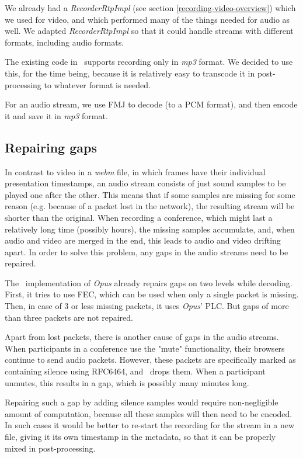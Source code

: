 \documentclass[twoside,openright,a4paper,12pt,english]{article}
\begin{document}
We already had a \emph{RecorderRtpImpl} (see section
\ref{recording-video-overview}) which we used for video, and which performed
many of the things needed for audio as well. We adapted \emph{RecorderRtpImpl}
so that it could handle streams with different formats, including audio
formats.

The existing code in \lj\ supports recording only in
\emph{mp3} format. We decided to use this, for the time being, because it is
relatively easy to transcode it in post-processing to whatever format is needed.

For an audio stream, we use FMJ to decode (to a PCM format), and
then encode it and save it in \emph{mp3} format.



\subsection{Repairing gaps}
In contrast to video in a \emph{webm} file, in which frames have their
individual presentation timestamps, an audio stream consists of just sound
samples to be played one after the other. This means that if some samples are missing
for some reason (e.g. because of a packet lost in the network), the resulting
stream will be shorter than the original. 
\medskip
When recording a conference, which might last a relatively long time (possibly
hours), the missing samples accumulate, and, when audio and video are merged in
the end, this leads to audio and video drifting apart. In order to solve this
problem, any gaps in the audio streams need to be repaired. 

\medskip
The \lj\ implementation of \emph{Opus} already repairs gaps on two levels while decoding.
First, it tries to use FEC, which can be used when only a single packet is
missing. Then, in case of 3 or less missing packets, it uses \emph{Opus}' PLC.
But gaps of more than three packets are not repaired.

Apart from lost packets, there is another cause of gaps in the audio streams. When
participants in a conference use the "mute" functionality, their browsers continue to send
audio packets. However, these packets are specifically marked as containing silence using
RFC6464, and \jvb\ drops them. When a participant unmutes, this results in a
gap, which is possibly many minutes long.

Repairing such a gap by adding silence samples would require non-negligible amount
of computation, because all these samples will then need to be encoded. In such cases
it would be better to re-start the
recording for the stream in a new file, giving it its own timestamp in the
metadata, so that it can be properly mixed in post-processing.
\end{document}
